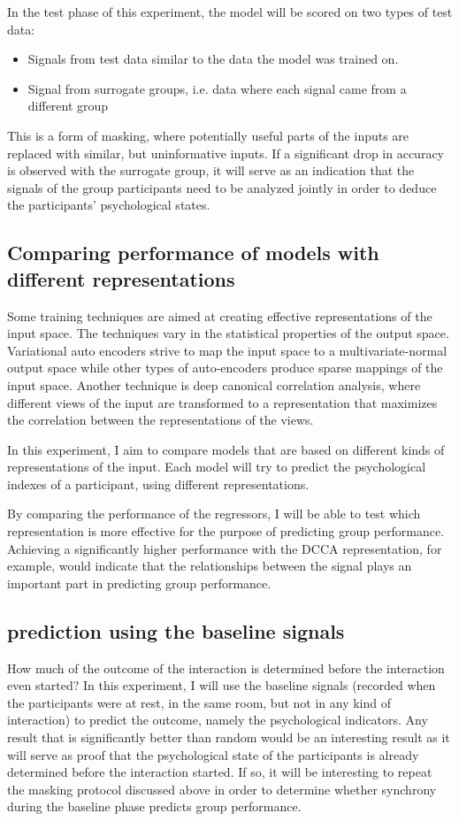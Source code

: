 \documentclass[a4paper, 11pt]{article}      %
\begin{document}
In the test phase of this experiment, the model will be scored on two types of test data:
\begin{itemize}
    \item 
    Signals from test data similar to the data the model was trained on.
    \item
    Signal from surrogate groups, i.e. data where each signal came from a different group
\end{itemize}
This is a form of masking, where potentially useful parts of the inputs are replaced with similar, but uninformative inputs.
If a significant drop in accuracy is observed with the surrogate group, it will serve as an indication that the signals of the group participants need to be analyzed jointly in order to  deduce the participants' psychological states.

\subsection{Comparing performance of models with different representations}
Some training techniques are aimed at creating effective representations of the input space. The techniques vary in the statistical properties of the output space. Variational auto encoders strive to map the input space to a multivariate-normal output space while other types of auto-encoders produce sparse mappings of the input space. Another technique is deep canonical correlation analysis, where different views of the input are transformed to a representation that maximizes the correlation between the representations of the views.

In this experiment, I aim to compare models that are based on different kinds of representations of the input. Each model will try to predict the psychological indexes of a participant, using different representations. 

By comparing the performance of the regressors, I will be able to test which representation is more effective for the purpose of predicting group performance. Achieving a significantly higher performance with the DCCA representation, for example, would indicate that the relationships between the signal plays an important part in predicting group performance.


\subsection{prediction using the baseline signals}
How much of the outcome of the interaction is determined before the interaction even started? In this experiment, I will use the baseline signals (recorded when the participants were at rest, in the same room, but not in any kind of interaction) to predict the outcome, namely the psychological indicators. Any result that is significantly better than random would be an interesting result as it will serve as proof that the psychological state of the participants is already determined before the interaction started. If so, it will be interesting to repeat the masking protocol discussed above in order to determine whether synchrony during the baseline phase predicts group performance.
\end{document}
